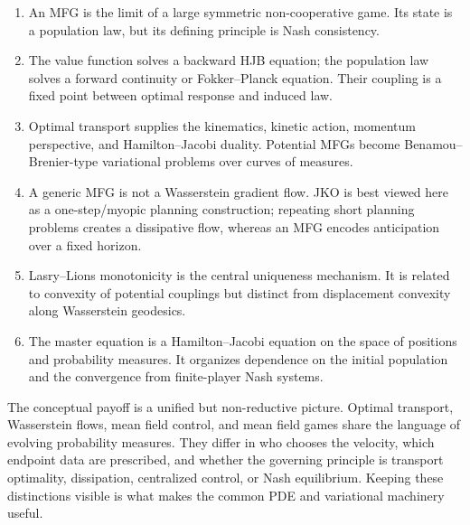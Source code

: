 \documentclass[11pt,a4paper]{article}
\theoremstyle{definition}
\begin{document}
\begin{enumerate}[leftmargin=2em]
  \item An MFG is the limit of a large symmetric non-cooperative game.  Its
  state is a population law, but its defining principle is Nash consistency.
  \item The value function solves a backward HJB equation; the population law
  solves a forward continuity or Fokker--Planck equation.  Their coupling is a
  fixed point between optimal response and induced law.
  \item Optimal transport supplies the kinematics, kinetic action, momentum
  perspective, and Hamilton--Jacobi duality.  Potential MFGs become
  Benamou--Brenier-type variational problems over curves of measures.
  \item A generic MFG is not a Wasserstein gradient flow.  JKO is best viewed
  here as a one-step/myopic planning construction; repeating short planning
  problems creates a dissipative flow, whereas an MFG encodes anticipation
  over a fixed horizon.
  \item Lasry--Lions monotonicity is the central uniqueness mechanism.  It is
  related to convexity of potential couplings but distinct from displacement
  convexity along Wasserstein geodesics.
  \item The master equation is a Hamilton--Jacobi equation on the space of
  positions and probability measures.  It organizes dependence on the initial
  population and the convergence from finite-player Nash systems.
\end{enumerate}

The conceptual payoff is a unified but non-reductive picture.  Optimal
transport, Wasserstein flows, mean field control, and mean field games share
the language of evolving probability measures.  They differ in who chooses
the velocity, which endpoint data are prescribed, and whether the governing
principle is transport optimality, dissipation, centralized control, or Nash
equilibrium.  Keeping these distinctions visible is what makes the common PDE
and variational machinery useful.



\end{document}
